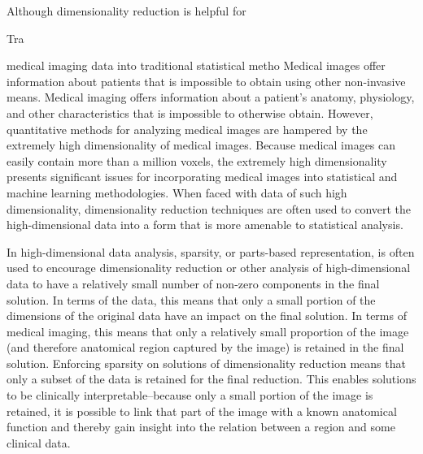 \documentclass{nih}
\begin{document}
Although dimensionality reduction is helpful for 

Tra



 medical imaging data into traditional statistical metho   Medical images offer information about patients that is impossible to obtain using other non-invasive means.  Medical imaging offers information about a patient's anatomy,  physiology, and other characteristics that is impossible to otherwise obtain.  However, quantitative methods for analyzing medical images are hampered by the extremely high dimensionality of medical images.  Because medical images can easily contain more than a million voxels, the extremely high dimensionality presents significant issues for incorporating medical images into statistical and machine learning methodologies.  When faced with data of such high dimensionality, dimensionality reduction techniques are often used to convert the high-dimensional data into a form that is more amenable to statistical analysis. 

In high-dimensional data analysis, sparsity, or parts-based representation, is often used to encourage dimensionality reduction or other analysis of high-dimensional data to have a relatively small number of non-zero components in the final solution.  In terms of the data, this means that only a small portion of the dimensions of the original data have an impact on the final solution.  In terms of medical imaging, this means that only a relatively small proportion of the image (and therefore anatomical region captured by the image) is retained in the final solution.  Enforcing sparsity on solutions of dimensionality reduction means that only a subset of the data is retained for the final reduction.  This enables solutions to be clinically interpretable--because only a small portion of the image is retained, it is possible to link that part of the image with a known anatomical function and thereby gain insight into the relation between a region and some clinical data. 





\end{document}
